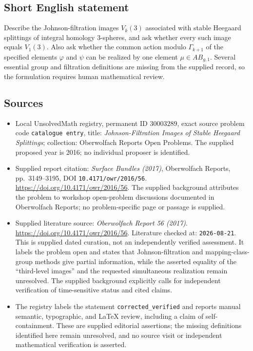 \documentclass[11pt]{article}
\begin{document}
\subsection{Short English statement}
Describe the Johnson-filtration images \(V_k(3)\) associated with stable Heegaard splittings of integral homology \(3\)-spheres, and ask whether every such image equals \(V_1(3)\). Also ask whether the common action modulo \(\Gamma_{k+1}\) of the specified elements \(\varphi\) and \(\psi\) can be realized by one element \(\mu\in AB_{g,1}\). Several essential group and filtration definitions are missing from the supplied record, so the formulation requires human mathematical review.
\subsection{Sources}
\begin{itemize}
\item Local UnsolvedMath registry, permanent ID \(30003289\), exact source problem code \texttt{catalogue entry}, title: \emph{Johnson-Filtration Images of Stable Heegaard Splittings}; collection: Oberwolfach Reports Open Problems. The supplied proposed year is 2016; no individual proposer is identified.
\item Supplied report citation: \emph{Surface Bundles (2017)}, Oberwolfach Reports, pp.\ 3149--3195, DOI \texttt{10.4171/owr/2016/56}. \url{https://doi.org/10.4171/owr/2016/56}. The supplied background attributes the problem to workshop open-problem discussions documented in Oberwolfach Reports; no problem-specific page or passage is supplied.
\item Supplied literature source: \emph{Oberwolfach Report 56 (2017)}. \url{https://doi.org/10.4171/owr/2016/56}. Literature checked at: \texttt{2026-08-21}. This is supplied dated curation, not an independently verified assessment. It labels the problem open and states that Johnson-filtration and mapping-class-group methods give partial information, while the asserted equality of the ``third-level images'' and the requested simultaneous realization remain unresolved. The supplied background explicitly calls for independent verification of time-sensitive status and cited claims.
\item The registry labels the statement \texttt{corrected\_verified} and reports manual semantic, typographic, and LaTeX review, including a claim of self-containment. These are supplied editorial assertions; the missing definitions identified here remain unresolved, and no source visit or independent mathematical verification is asserted.
\end{itemize}
\end{document}
